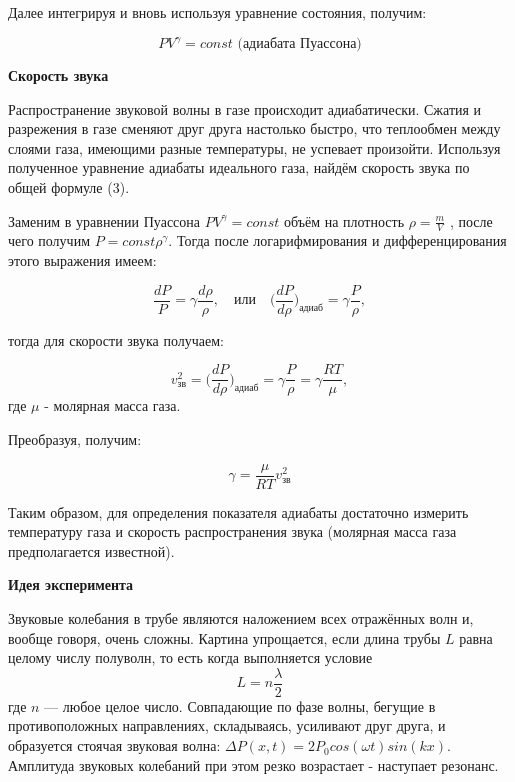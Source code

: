 \documentclass[10pt]{article}
\begin{document}
    Далее интегрируя и вновь используя уравнение состояния, получим:

    \begin{equation}
        PV^{\gamma} = const
        \text{  (адиабата Пуассона)}
    \end{equation}

    \textbf{Скорость звука}

    Распространение звуковой волны в газе происходит адиабатически. Сжатия и разрежения в газе сменяют друг друга настолько быстро, что теплообмен между слоями газа, имеющими разные температуры, не успевает произойти. Используя полученное уравнение адиабаты идеального газа, найдём скорость звука по общей формуле (3).

    Заменим в уравнении Пуассона $PV^{\gamma} = const$ объём на плотность $\rho = \frac{m}{V}$ , после чего получим $P = const \rho^{\gamma} $. Тогда после логарифмирования и дифференцирования этого выражения имеем:

    \begin{equation}
        \frac{dP}{P} = \gamma \frac {d\rho}{\rho}, \quad \text{или} \quad \bigg(\frac{dP}{d\rho}\bigg)_\text{адиаб} = \gamma \frac{P}{\rho},
    \end{equation}

    тогда для скорости звука получаем:

    \begin{equation}
        v_\text{зв}^2 = \bigg(\frac{dP}{d\rho}\bigg)_\text{адиаб} = \gamma \frac{P}{\rho} = \gamma \frac{RT}{\mu},
    \end{equation}
    где $\mu$ - молярная масса газа.

    Преобразуя, получим:

    \begin{equation}
        \gamma = \frac{\mu}{RT}v_\text{зв}^2
    \end{equation}

    Таким образом, для определения показателя адиабаты достаточно измерить температуру газа и скорость распространения звука (молярная масса газа предполагается известной).

    \textbf{Идея эксперимента}

    Звуковые колебания в трубе являются наложением всех отражённых волн и, вообще говоря, очень сложны. Картина упрощается, если длина трубы $𝐿$ равна целому числу полуволн, то есть когда выполняется условие
    \begin{equation}
        L = n\frac{\lambda}{2}
    \end{equation}
    где $n$ — любое целое число. Совпадающие по фазе волны, бегущие в противоположных направлениях, складываясь, усиливают друг друга, и образуется стоячая звуковая волна:
    $\Delta P (x,t) = 2𝑃_0 cos(\omega t) sin(kx).$
    Амплитуда звуковых колебаний при этом резко возрастает - наступает резонанс.
\end{document}
